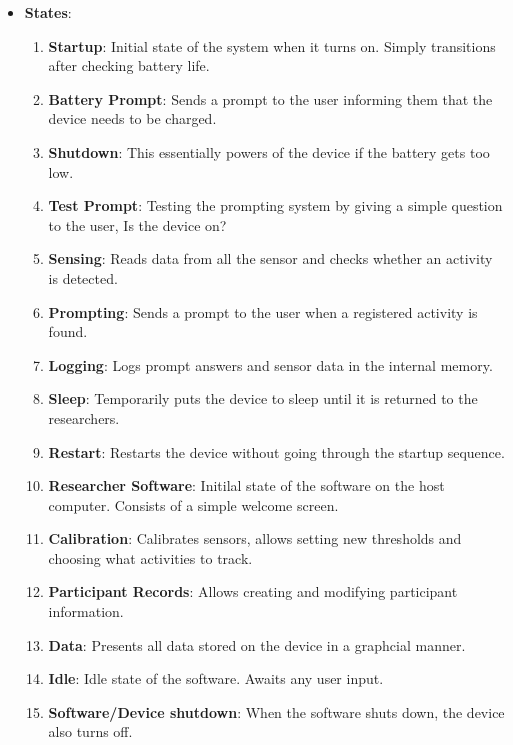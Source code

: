 \documentclass[12pt]{article}
\begin{document}
\begin{itemize}
\item \textbf{States}:
	\begin{enumerate}
		\item \textbf{Startup}: Initial state of the system when it turns on. Simply transitions after checking battery life.           
		\item \textbf{Battery Prompt}: Sends a prompt to the user informing them that the device needs to be charged.
		\item \textbf{Shutdown}: This essentially powers of the device if the battery gets too low. 
		\item \textbf{Test Prompt}: Testing the prompting system by giving a simple question to the user, Is the device on?
		\item \textbf{Sensing}: Reads data from all the sensor and checks whether an activity is detected.
		\item \textbf{Prompting}: Sends a prompt to the user when a registered activity is found. 
		\item \textbf{Logging}: Logs prompt answers and sensor data in the internal memory.
		\item \textbf{Sleep}: Temporarily puts the device to sleep until it is returned to the researchers.
		\item \textbf{Restart}: Restarts the device without going through the startup sequence.
		\item \textbf{Researcher Software}: Initilal state of the software on the host computer. Consists of a simple welcome screen.
		\item \textbf{Calibration}: Calibrates sensors, allows setting new thresholds and choosing what activities to track.
		\item \textbf{Participant Records}: Allows creating and modifying participant information.
		\item \textbf{Data}: Presents all data stored on the device in a graphcial manner.
		\item \textbf{Idle}: Idle state of the software. Awaits any user input.
		\item \textbf{Software/Device shutdown}: When the software shuts down, the device also turns off.
	\end{enumerate}
\end{itemize}

\end{document}
